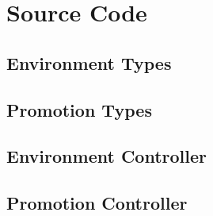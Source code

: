 \chapter{Source Code}\label{appendix:source-code}


\section{Environment Types}


\pagebreak

\section{Promotion Types}


\pagebreak

\section{Environment Controller}


\pagebreak

\section{Promotion Controller}


\pagebreak







%
%
%
%
%
%
%
%
%
%
%
%
%
%
%
%
%
%




